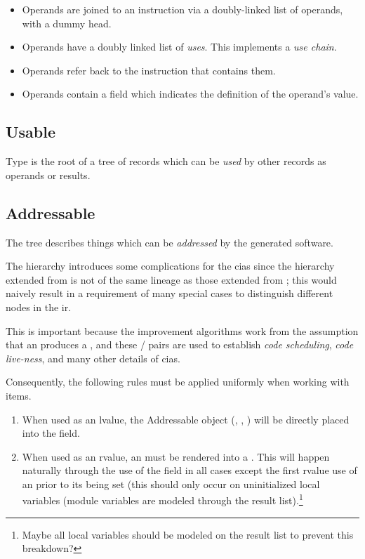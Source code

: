 \begin{itemize}
\item Operands are joined to an instruction via a doubly-linked list of
  operands, with a dummy head.
\item Operands have a doubly linked list of \emph{uses}.  This
  implements a \emph{use chain}.

\item Operands refer back to the instruction that contains them.

\item Operands contain a field which indicates the definition of the
  operand's value.
\end{itemize}

\subsection{Usable}

Type  is the root of a tree of records which can be
\emph{used} by other records as operands or results.

\subsection{Addressable}

The  tree describes things which can be
\emph{addressed} by the generated software.

The  hierarchy introduces some complications for the
\acp{cia} since the hierarchy extended from  is not
of the same lineage as those extended from ; this would
naively result in a requirement of many special cases to distinguish
different nodes in the \ac{ir}.

This is important because the improvement algorithms work from the
assumption that an  produces a , and
these / pairs are used to establish
\emph{code scheduling}, \emph{code live-ness}, and many other
details of \acp{cia}.

Consequently, the following rules must be applied uniformly when
working with  items.

\begin{enumerate}
\item When used as an lvalue, the Addressable object (,
  , ) will be directly placed into the
   field.

\item When used as an rvalue, an  must be rendered
  into a .  This will happen naturally through the use of
  the  field in all cases except the first
  rvalue use of an  prior to its being set (this
  should only occur on uninitialized local variables (module variables
  are modeled through the  result
  list).\footnote{Maybe all local variables should be modeled on the
     result list to prevent this breakdown?}
\end{enumerate}

